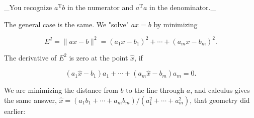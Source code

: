 _You recognize \(a^{\mathrm{T}}b\) in the numerator and \(a^{\mathrm{T}}a\) in the denominator._

The general case is the same. We "solve" \(ax=b\) by minimizing

\[E^{2}=\|ax-b\|^{2}=(a_{1}x-b_{1})^{2}+\cdots+(a_{m}x-b_{m})^{2}.\]

The derivative of \(E^{2}\) is zero at the point \(\widehat{x}\), if

\[(a_{1}\widehat{x}-b_{1})a_{1}+\cdots+(a_{m}\widehat{x}-b_{m})a_{m}=0.\]

We are minimizing the distance from \(b\) to the line through \(a\), and calculus gives the same answer, \(\widehat{x}=(a_{1}b_{1}+\cdots+a_{m}b_{m})/(a_{1}^{2}+\cdots+a_{m}^{2})\), that geometry did earlier: